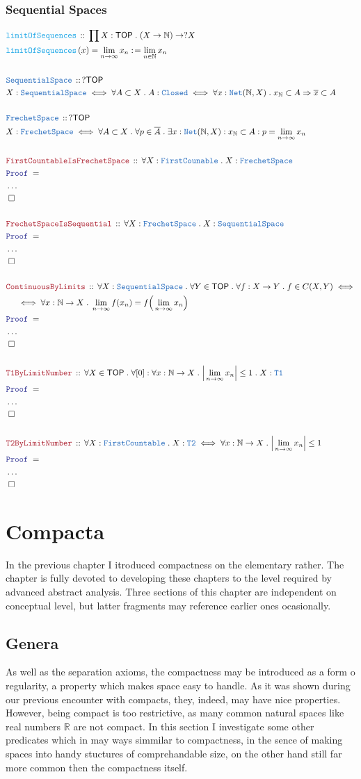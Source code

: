 \documentclass[12pt]{scrartcl}
\newcommand{\TYPE}[1]{\textcolor{NavyBlue}{\mathtt{#1}}}
\newcommand{\FUNC}[1]{\textcolor{Cerulean}{\mathtt{#1}}}
\newcommand{\LOGIC}[1]{\textcolor{Blue}{\mathtt{#1}}}
\newcommand{\THM}[1]{\textcolor{Maroon}{\mathtt{#1}}}
\renewcommand{\.}{\; . \;}
\newcommand{\de}{: \kern 0.1pc =}
\newcommand{\Act}[1]{\left( #1 \right)}
\newcommand{\Theorem}[2]{& \THM{#1} \, :: \, #2 \\ & \Proof = \\ }
\newcommand{\DeclareType}[2]{& \TYPE{#1} \, :: \, #2 \\}
\newcommand{\DefineType}[3]{& #1 : \TYPE{#2} \iff #3 \\}
\newcommand{\DeclareFunc}[2]{& \FUNC{#1} \, :: \, #2 \\}
\newcommand{\DefineNamedFunc}[4]{&  \FUNC{#1}\Act{#2} = #3 \de #4 \\}
\newcommand{\NewLine}{\\ & \kern 1pc}
\newcommand{\Page}[1]{ \begin{align*} #1 \end{align*}   }
\newcommand{\NoProof}{ & \ldots \\ \EndProof}
\newcommand{\Imply}{\Rightarrow}
\newcommand{\Reals}{\mathbb{R} }
\newcommand{\Nat}{\mathbb{N} }
\newcommand{\QED}{\; \square}
\newcommand{\EndProof}{& \QED \\}
\newcommand{\Proof}{\LOGIC{Proof} \; }
\newcommand{\TOP}{\mathsf{TOP}}
\begin{document}
\subsubsection{Sequential Spaces}
\Page{
	\DeclareFunc{limitOfSequences}
	{
		\prod X : \TOP \. 
		(X \to \Nat) \to ?X
	}
	\DefineNamedFunc{limitOfSequences}
	{ x }{ \lim_{n \to \infty} x_n  }{\lim_{n \in \Nat} x_n}
	\\
	\DeclareType{SequentialSpace}
	{
		?\TOP
	}
	\DefineType{X}{SequentialSpace}
	{
		\forall A \subset X \.
		A : \TYPE{Closed} \iff 
		\forall x : \TYPE{Net}(\Nat, X) \. x_{\Nat} \subset A \Imply \overline{x} \subset A
	}
	\\
	\DeclareType{FrechetSpace}
	{
		?\TOP
	}
	\DefineType{X}{FrechetSpace}
	{
		\forall A \subset X \.
		\forall p \in \overline{A} \.
		\exists x : \TYPE{Net}(\Nat,X) : x_\Nat \subset A : p = \lim_{n \to \infty} x_n
	}
	\\
	\Theorem{FirstCountableIsFrechetSpace}
	{
		\forall X : \TYPE{FirstCounable} \.
		X : \TYPE{FrechetSpace} 
	}
	\NoProof
	\\
	\Theorem{FrechetSpaceIsSequential}
	{
		\forall X : \TYPE{FrechetSpace} \.
		X : \TYPE{SequentialSpace} 
	}
	\NoProof
	\\
	\Theorem{ContinuousByLimits}
	{
		\forall X : \TYPE{SequentialSpace} \.
		\forall Y \in \TOP \.
		\forall f : X \to Y  \.
		f \in C(X,Y)
		\iff \NewLine \iff
		\forall x : \Nat \to X \.
		\lim_{n \to \infty} f(x_n) = f\Big( \lim_{n \to \infty} x_n \Big)
	}
	\NoProof
	\\
	\Theorem{T1ByLimitNumber}
	{
		\forall X \in \TOP \.
		\forall [0] : \forall x : \Nat \to X \. 
		\Big|\lim_{n \to \infty} x_n\Big| \le 1 \.
		X : \TYPE{T1}
	}
	\NoProof
	\\
	\Theorem{T2ByLimitNumber}
	{
		\forall X : \TYPE{FirstCountable} \.
		X : \TYPE{T2} 
		\iff
		\forall x : \Nat \to X \. \Big| \lim_{n\to\infty} x_n \Big| \le 1
	}
	\NoProof
}
\newpage
\section{Compacta}
In the previous chapter I itroduced compactness on the elementary rather. 
The chapter is fully devoted to developing these chapters to the level required 
by advanced abstract analysis. 
Three sections of this chapter are independent on conceptual level, 
but latter fragments may reference earlier ones ocasionally.
\subsection{Genera}
As well as the separation axioms, 
the compactness may be introduced as a form o regularity, 
a property which makes space easy to handle.
As it was shown during our previous encounter with compacts, 
they, indeed, may have nice properties.
However, being compact is too restrictive,
as many common natural spaces like real numbers $\Reals$ are not compact.
In this section I investigate some other predicates which in may ways simmilar to compactness,
in the sence of making spaces into handy stuctures of comprehandable size, 
on the other hand still far more common then the compactness itself. 
\end{document}
